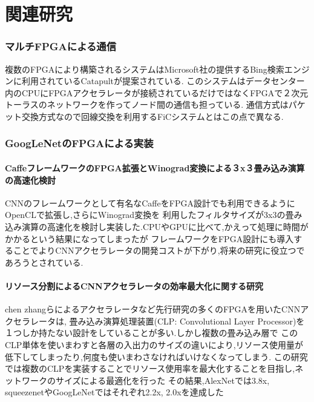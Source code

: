 \chapter{関連研究}
{
\label{chap:survey}

\subsection{マルチFPGAによる通信}
複数のFPGAにより構築されるシステムはMicrosoft社の提供するBing検索エンジンに利用されているCatapult\cite{catapult1st}が提案されている.
このシステムはデータセンター内のCPUにFPGAアクセラレータが接続されているだけではなくFPGAで２次元トーラスのネットワークを作ってノード間の通信も担っている.
通信方式はパケット交換方式なので回線交換を利用するFiCシステムとはこの点で異なる.

\subsection{GoogLeNetのFPGAによる実装}

\subsubsection{CaffeフレームワークのFPGA拡張とWinograd変換による３x３畳み込み演算の高速化検討}
CNNのフレームワークとして有名なCaffeをFPGA設計でも利用できるようにOpenCLで拡張し,さらにWinograd変換を
利用したフィルタサイズが3x3の畳み込み演算の高速化を検討し実装した\cite{caffeinated}.CPUやGPUに比べて,かえって処理に時間がかかるという結果になってしまったが
フレームワークをFPGA設計にも導入することでよりCNNアクセラレータの開発コストが下がり,将来の研究に役立つであろうとされている.
\subsubsection{リソース分割によるCNNアクセラレータの効率最大化に関する研究}
chen zhangらによるアクセラレータ\cite{optimized}など先行研究の多くのFPGAを用いたCNNアクセラレータは,
畳み込み演算処理装置(CLP: Convolutional Layer Processor)を１つしか持たない設計をしていることが多い.しかし複数の畳み込み層で
このCLP単体を使いまわすと各層の入出力のサイズの違いにより,リソース使用量が低下してしまったり,何度も使いまわさなければいけなくなってしまう.
この研究では複数のCLPを実装することでリソース使用率を最大化することを目指し,ネットワークのサイズによる最適化を行った\cite{max}
その結果,AlexNet\cite{alexnet}では3.8x, squeezenet\cite{googlenet}やGoogLeNet\cite{googlenet}ではそれぞれ2.2x, 2.0xを達成した
}